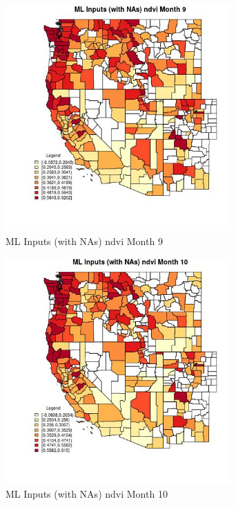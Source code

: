 \begin{figure} 
\centering  
\includegraphics[width=0.77\textwidth]{Code_Outputs/Report_ML_input_PM25_Step4_part_e_de_duplicated_aves_compiled_2019-05-21wNAs_CountyndvimedianMonth9.jpg} 
\caption{\label{fig:Report_ML_input_PM25_Step4_part_e_de_duplicated_aves_compiled_2019-05-21wNAsCountyndvimedianMonth9}ML Inputs (with NAs) ndvi Month 9} 
\end{figure} 
 

\begin{figure} 
\centering  
\includegraphics[width=0.77\textwidth]{Code_Outputs/Report_ML_input_PM25_Step4_part_e_de_duplicated_aves_compiled_2019-05-21wNAs_CountyndvimedianMonth10.jpg} 
\caption{\label{fig:Report_ML_input_PM25_Step4_part_e_de_duplicated_aves_compiled_2019-05-21wNAsCountyndvimedianMonth10}ML Inputs (with NAs) ndvi Month 10} 
\end{figure} 
 

